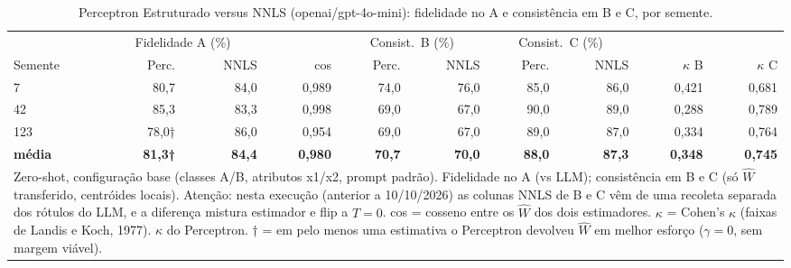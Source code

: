 \begin{table}[htbp]
\centering
\small
\caption{Perceptron Estruturado versus NNLS (openai/gpt-4o-mini): fidelidade no A e consistência em B e C, por semente.}
\label{tab:bloco1_A_perceptron_vs_nnls_por_semente_gpt4mini}
\begin{tabular}{lrrrrrrrrr}
\toprule
 & \multicolumn{2}{c}{Fidelidade A (\%)} &  & \multicolumn{2}{c}{Consist.\ B (\%)} & \multicolumn{2}{c}{Consist.\ C (\%)} &  &  \\ \cmidrule(lr){2-3} \cmidrule(lr){5-6} \cmidrule(lr){7-8}
Semente & Perc. & NNLS & cos & Perc. & NNLS & Perc. & NNLS & $\kappa$ B & $\kappa$ C \\
\midrule
7 & 80,7 & 84,0 & 0,989 & 74,0 & 76,0 & 85,0 & 86,0 & 0,421 & 0,681 \\
42 & 85,3 & 83,3 & 0,998 & 69,0 & 67,0 & 90,0 & 89,0 & 0,288 & 0,789 \\
123 & 78,0† & 86,0 & 0,954 & 69,0 & 67,0 & 89,0 & 87,0 & 0,334 & 0,764 \\
\midrule
\textbf{média} & \textbf{81,3†} & \textbf{84,4} & \textbf{0,980} & \textbf{70,7} & \textbf{70,0} & \textbf{88,0} & \textbf{87,3} & \textbf{0,348} & \textbf{0,745} \\
\bottomrule
\multicolumn{10}{p{0.95\linewidth}}{\footnotesize Zero-shot, configuração base (classes A/B, atributos x1/x2, prompt padrão). Fidelidade no A (vs LLM); consistência em B e C (só $\hat{W}$ transferido, centróides locais). Atenção: nesta execução (anterior a 10/10/2026) as colunas NNLS de B e C vêm de uma recoleta separada dos rótulos do LLM, e a diferença mistura estimador e flip a $T=0$. cos = cosseno entre os $\hat{W}$ dos dois estimadores. $\kappa$ = Cohen's $\kappa$ (faixas de Landis e Koch, 1977). $\kappa$ do Perceptron. † = em pelo menos uma estimativa o Perceptron devolveu $\hat{W}$ em melhor esforço ($\gamma = 0$, sem margem viável).} \\
\end{tabular}
\end{table}

